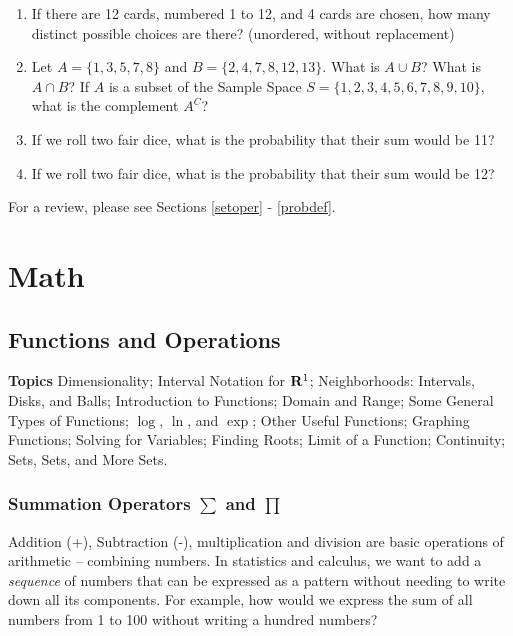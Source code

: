 \documentclass[
]{book}
\providecommand{\tightlist}{%
  \setlength{\itemsep}{0pt}\setlength{\parskip}{0pt}}
\theoremstyle{definition}
\theoremstyle{definition}
\theoremstyle{definition}
\theoremstyle{remark}
\begin{document}
\begin{enumerate}
\def\labelenumi{\arabic{enumi}.}
\tightlist
\item
  If there are 12 cards, numbered 1 to 12, and 4 cards are chosen, how many distinct possible choices are there? (unordered, without replacement)
\item
  Let \(A = \{1,3,5,7,8\}\) and \(B = \{2,4,7,8,12,13\}\). What is \(A \cup B\)? What is \(A \cap B\)? If \(A\) is a subset of the Sample Space \(S = \{1,2,3,4,5,6,7,8,9,10\}\), what is the complement \(A^C\)?
\item
  If we roll two fair dice, what is the probability that their sum would be 11?
\item
  If we roll two fair dice, what is the probability that their sum would be 12?
\end{enumerate}

For a review, please see Sections \ref{setoper} - \ref{probdef}.

\hypertarget{part-math}{%
\part{Math}\label{part-math}}

\hypertarget{functions-and-operations}{%
\chapter{Functions and Operations}\label{functions-and-operations}}

\textbf{Topics}
Dimensionality;
Interval Notation for \({\bf R}^1\);
Neighborhoods: Intervals, Disks, and Balls; Introduction to Functions;
Domain and Range;
Some General Types of Functions;
\(\log\), \(\ln\), and \(\exp\);
Other Useful Functions;
Graphing Functions;
Solving for Variables;
Finding Roots;
Limit of a Function;
Continuity; Sets, Sets, and More Sets.

\hypertarget{sum-notation}{%
\section{\texorpdfstring{Summation Operators \(\sum\) and \(\prod\)}{Summation Operators \textbackslash sum and \textbackslash prod}}\label{sum-notation}}

Addition (+), Subtraction (-), multiplication and division are basic operations of arithmetic -- combining numbers. In statistics and calculus, we want to add a \emph{sequence} of numbers that can be expressed as a pattern without needing to write down all its components. For example, how would we express the sum of all numbers from 1 to 100 without writing a hundred numbers?
\end{document}

